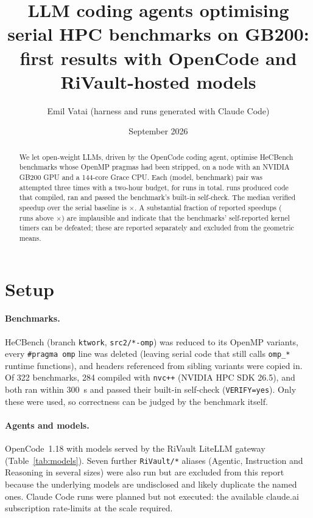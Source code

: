 \documentclass[11pt,a4paper]{article}
\title{LLM coding agents optimising serial HPC benchmarks on GB200:\\
       first results with OpenCode and RiVault-hosted models}
\author{Emil Vatai (harness and runs generated with Claude Code)}
\date{September 2026}
\begin{document}
\maketitle

\begin{abstract}
We let \nmodels{} open-weight LLMs, driven by the OpenCode coding agent, optimise
\nbenchmarks{} HeCBench benchmarks whose OpenMP pragmas had been stripped, on a
node with an NVIDIA GB200 GPU and a 144-core Grace CPU. Each (model, benchmark)
pair was attempted three times with a two-hour budget, for \nruns{} runs in total.
\ncorrect{} runs produced code that compiled, ran and passed the benchmark's
built-in self-check. The median verified speedup over the serial baseline is
\medianspeedup$\times$. A substantial fraction of reported speedups
(\nsuspicious{} runs above \suspiciouscap$\times$) are implausible and indicate
that the benchmarks' self-reported kernel timers can be defeated; these are
reported separately and excluded from the geometric means.
\end{abstract}

\section{Setup}

\paragraph{Benchmarks.}
HeCBench (branch \texttt{ktwork}, \texttt{src2/*-omp}) was reduced to its OpenMP
variants, every \texttt{\#pragma omp} line was deleted (leaving serial code that
still calls \texttt{omp\_*} runtime functions), and headers referenced from
sibling variants were copied in. Of 322 benchmarks, 284 compiled with
\texttt{nvc++} (NVIDIA HPC SDK 26.5), and \nbenchmarks{} both ran within
\SI{300}{s} and passed their built-in self-check (\texttt{VERIFY=yes}). Only
these \nbenchmarks{} were used, so correctness can be judged by the benchmark
itself.

\paragraph{Agents and models.}
OpenCode~1.18 with \nmodels{} models served by the RiVault LiteLLM gateway
(Table~\ref{tab:models}). Seven further \texttt{RiVault/*} aliases (Agentic,
Instruction and Reasoning in several sizes) were also run but are excluded from
this report because the underlying models are undisclosed and likely duplicate
the named ones. Claude Code runs were planned but not executed: the
available claude.ai subscription rate-limits at the scale required.
\end{document}
